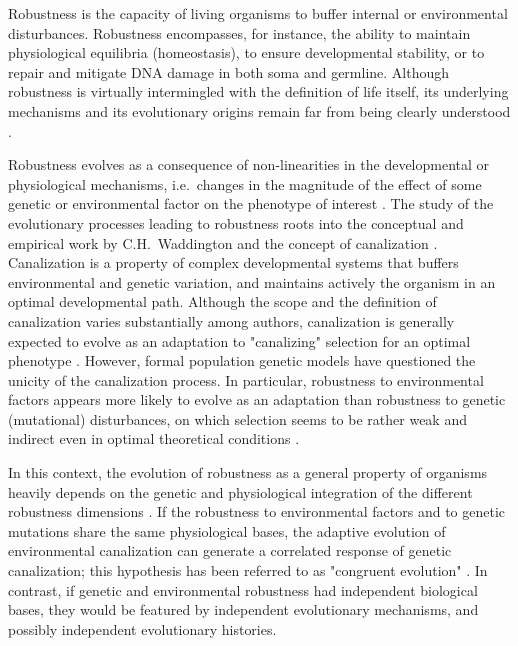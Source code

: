 \documentclass[10pt,a4paper]{article}
\begin{document}
Robustness is the capacity of living organisms to buffer internal or environmental disturbances. Robustness encompasses, for instance, the ability to maintain physiological equilibria (homeostasis), to ensure developmental stability, or to repair and mitigate DNA damage in both soma and germline. Although robustness is virtually intermingled with the definition of life itself, its underlying mechanisms and its evolutionary origins remain far from being clearly understood \citep{Ste02,MS09,Wag13,HGK+19}. 

Robustness evolves as a consequence of non-linearities in the developmental or physiological mechanisms, i.e.\ changes in the magnitude of the effect of some genetic or environmental factor on the phenotype of interest \citep{Nij02}. The study of the evolutionary processes leading to robustness roots into the conceptual and empirical work by C.H.\ Waddington and the concept of canalization \citep{Wad42,Sch49,Wad59,Loi19}. Canalization is a property of complex developmental systems that buffers environmental and genetic variation, and maintains actively the organism in an optimal developmental path. Although the scope and the definition of canalization varies substantially among authors, canalization is generally expected to evolve as an adaptation to "canalizing" selection for an optimal phenotype \citep{EM98,DD01,Fla05,Kli19}. However, formal population genetic models have questioned the unicity of the canalization process. In particular, robustness to environmental factors appears more likely to evolve as an adaptation than robustness to genetic (mutational) disturbances, on which selection seems to be rather weak and indirect even in optimal theoretical conditions \citep{WBB97, HHW03,LAH13}. 

In this context, the evolution of robustness as a general property of organisms heavily depends on the genetic and physiological integration of the different robustness dimensions \citep{Far15}. If the robustness to environmental factors and to genetic mutations share the same physiological bases, the adaptive evolution of environmental canalization can generate a correlated response of genetic canalization; this hypothesis has been referred to as "congruent evolution" \citep{dHW+03}. In contrast, if genetic and environmental robustness had independent biological bases, they would be featured by independent evolutionary mechanisms, and possibly independent evolutionary histories. 
\end{document}
